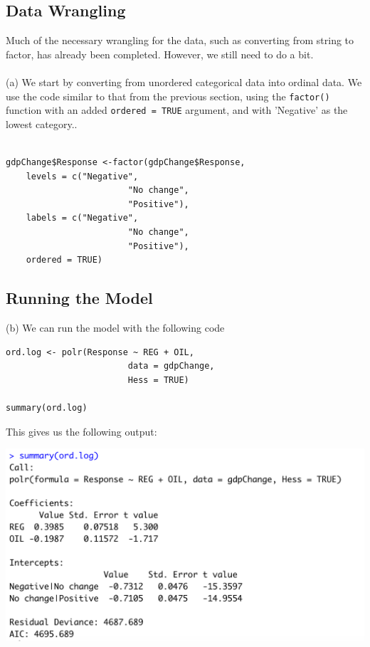 \documentclass[12pt,letterpaper]{article}
\begin{document}
\subsection{Data Wrangling}

\noindent Much of the necessary wrangling for the data, such as converting from string to factor, has already been completed. However, we still need to do a bit.
\\\\
\noindent (a) We start by converting from unordered categorical data into ordinal data. We use the code similar to that from the previous section, using the \texttt{factor()} function with an added \texttt{ordered = TRUE} argument, and with 'Negative' as the lowest category..
\\\\
\begin{lstlisting}
gdpChange$Response <-factor(gdpChange$Response,
	levels = c("Negative",
						"No change",
						"Positive"),
	labels = c("Negative",
						"No change",
						"Positive"),
	ordered = TRUE)
\end{lstlisting}

\subsection{Running the Model}

\noindent (b) We can run the model with the following code

\begin{lstlisting}
ord.log <- polr(Response ~ REG + OIL,
						data = gdpChange,
						Hess = TRUE)

summary(ord.log)
\end{lstlisting}

\noindent This gives us the following output:

\includegraphics[width=\linewidth]{ordinal.mult.reg}
\\\\
\end{document}

